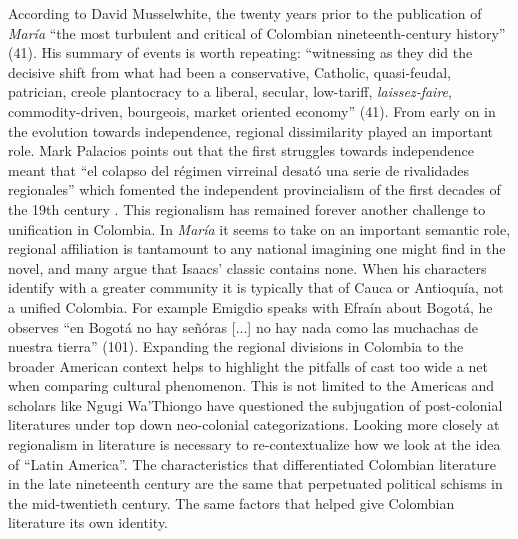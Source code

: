 \documentclass[12pt]{report}
\begin{document}
According to David Musselwhite, the twenty years prior to the publication of \textit{María} \enquote{the most turbulent and critical of Colombian nineteenth-century history} \nocite{Musselwhite2006}(41). His summary of events is worth repeating: \enquote{witnessing as they did the decisive shift from what had been a conservative, Catholic, quasi-feudal, patrician, creole plantocracy to a liberal, secular, low-tariff, \textit{laissez-faire}, commodity-driven, bourgeois, market oriented economy} \nocite{Musselwhite2006}(41). From early on in the evolution towards independence, regional dissimilarity played an important role. Mark Palacios points out that the first struggles towards independence meant that \enquote{el colapso del régimen virreinal desató una serie de rivalidades regionales} which fomented the independent provincialism of the first decades of the 19th century \autocite[205]{Palacios2002}. This regionalism has remained forever another challenge to unification in Colombia. In \textit{María} it seems to take on an important semantic role, regional affiliation is tantamount to any national imagining one might find in the novel, and many argue that Isaacs' classic contains none. When his characters identify with a greater community it is typically that of Cauca or Antioquía, not a unified Colombia. For example Emigdio speaks with Efraín about Bogotá, he observes \enquote{en Bogotá no hay señóras [...] no hay nada como las muchachas de nuestra tierra} (101). Expanding the regional divisions in Colombia to the broader American context helps to highlight the pitfalls of cast too wide a net when comparing cultural phenomenon. This is not limited to the Americas and scholars like Ngugi Wa’Thiongo have questioned the subjugation of post-colonial literatures under top down neo-colonial categorizations.
Looking more closely at regionalism in literature is necessary to re-contextualize how we look at the idea of \enquote{Latin America}. 
The characteristics that differentiated Colombian literature in the late nineteenth century are the same that perpetuated political schisms in the mid-twentieth century. The same factors that helped give Colombian literature its own identity. 


\end{document}
